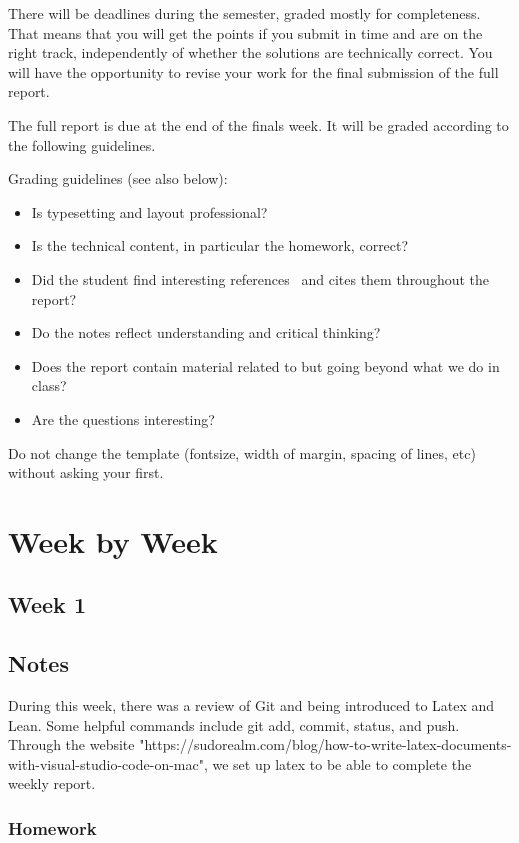\documentclass{article}
\theoremstyle{theorem}
\theoremstyle{definition}
\theoremstyle{remark}
\begin{document}
There will be deadlines during the semester, graded mostly for completeness. That means that you will get the points if you submit in time and are on the right track, independently of whether the solutions are technically correct. You will have the opportunity to revise your work for the final submission of the full report.

The full report is due at the end of the finals week. It will be graded according to the following guidelines.

Grading  guidelines (see also below):
\begin{itemize}
\item Is typesetting and layout professional? 
\item Is the technical content, in particular the homework, correct?
\item Did the student find interesting references~\cite{bla} and cites them throughout the report?
\item Do the notes reflect understanding and critical thinking?
\item Does the report contain material related to but going beyond what we do in class?
\item Are the questions interesting?
\end{itemize}

Do not change the template (fontsize, width of margin, spacing of lines, etc) without asking your first.

\section{Week by Week}\label{homework}

\subsection{Week 1}

\subsection*{Notes}

During this week, there was a review of Git and being introduced to Latex and Lean. Some helpful commands include git add, commit, status, and push. 
Through the website "https://sudorealm.com/blog/how-to-write-latex-documents-with-visual-studio-code-on-mac", we set up latex to be able to complete the weekly report.

\subsubsection*{Homework}
\end{document}

